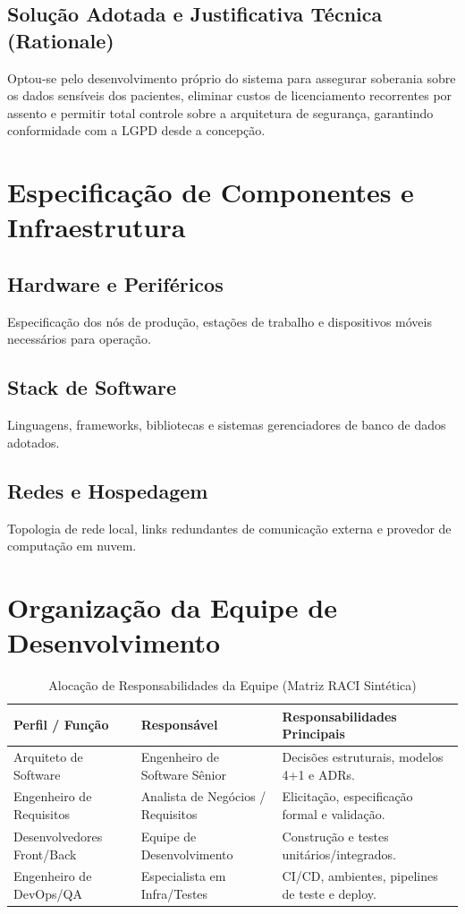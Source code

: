 \subsection{Solução Adotada e Justificativa Técnica (Rationale)}
Optou-se pelo desenvolvimento próprio do sistema para assegurar soberania sobre os dados sensíveis dos pacientes, eliminar custos de licenciamento recorrentes por assento e permitir total controle sobre a arquitetura de segurança, garantindo conformidade com a LGPD desde a concepção.

\section{Especificação de Componentes e Infraestrutura}
\subsection{Hardware e Periféricos}
Especificação dos nós de produção, estações de trabalho e dispositivos móveis necessários para operação.

\subsection{Stack de Software}
Linguagens, frameworks, bibliotecas e sistemas gerenciadores de banco de dados adotados.

\subsection{Redes e Hospedagem}
Topologia de rede local, links redundantes de comunicação externa e provedor de computação em nuvem.

\section{Organização da Equipe de Desenvolvimento}
\begin{table}[htbp]
\caption{Alocação de Responsabilidades da Equipe (Matriz RACI Sintética)}
\label{tab:equipe_raci}
\centering
\small
\begin{tabularx}{\textwidth}{|l|l|Y|}
\hline
{}
\textbf{Perfil / Função} & \textbf{Responsável} & \textbf{Responsabilidades Principais} \\ \hline
Arquiteto de Software & Engenheiro de Software Sênior & Decisões estruturais, modelos 4+1 e ADRs. \\ \hline
Engenheiro de Requisitos & Analista de Negócios / Requisitos & Elicitação, especificação formal e validação. \\ \hline
Desenvolvedores Front/Back & Equipe de Desenvolvimento & Construção e testes unitários/integrados. \\ \hline
Engenheiro de DevOps/QA & Especialista em Infra/Testes & CI/CD, ambientes, pipelines de teste e deploy. \\ \hline
\end{tabularx}
\end{table}

